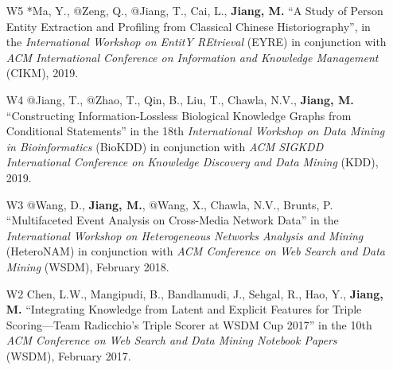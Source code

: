 \documentclass[10pt]{article}
\newenvironment{myindentpar}[1]%
{\begin{list}{}%
         {\setlength{\leftmargin}{#1}}%
         \item[]%
}
{\end{list}}
\newcounter{list}
\newcommand{\hide}[1]{}
\begin{document}
\begin{myindentpar}{0.00cm}
\begin{enumerate}[leftmargin=.5cm]
	\hide{\vspace{-0.1cm}\hspace{0.5cm}{\small \emph{I conceived the idea and wrote the paper. Mr. Zeng designed the study, and completed the experiments.}}}
	
\item[W5] *Ma, Y., @Zeng, Q., @Jiang, T., Cai, L., \textbf{Jiang, M.} ``A Study of Person Entity Extraction and Profiling from Classical Chinese Historiography'', in the \textit{International Workshop on EntitY REtrieval} (EYRE) in conjunction with \textit{ACM International Conference on Information and Knowledge Management} (CIKM), 2019.

	\hide{\vspace{-0.1cm}\hspace{0.5cm}{\small \emph{I conceived the idea. Mr. Ma designed the study, completed the experiments, and wrote the paper. I edited the paper.}}}

\item[W4] @Jiang, T., @Zhao, T., Qin, B., Liu, T., Chawla, N.V., \textbf{Jiang, M.} ``Constructing Information-Lossless Biological Knowledge Graphs from Conditional Statements'' in the 18th \textit{International Workshop on Data Mining in Bioinformatics} (BioKDD) in conjunction with \textit{ACM SIGKDD International Conference on Knowledge Discovery and Data Mining} (KDD), 2019.

	\hide{\vspace{-0.1cm}\hspace{0.5cm}{\small \emph{Mr. Jiang conceived the idea and wrote the paper. I edited the paper.}}}
	
\item[W3] @Wang, D., \textbf{Jiang, M.}, @Wang, X., Chawla, N.V., Brunts, P. ``Multifaceted Event Analysis on Cross-Media Network Data'' in the \textit{International Workshop on Heterogeneous Networks Analysis and Mining} (HeteroNAM) in conjunction with \textit{ACM Conference on Web Search and Data Mining} (WSDM), February 2018.

	\hide{\vspace{-0.1cm}\hspace{0.5cm}{\small \emph{I conceived the idea in consultation with Mr. Wang. Mr. Wang designed the study, completed the experiments, and wrote the paper. I edited the paper.}}}

\item[W2] Chen, L.W., Mangipudi, B., Bandlamudi, J., Sehgal, R., Hao, Y., \textbf{Jiang, M.} ``Integrating Knowledge from Latent and Explicit Features for Triple Scoring—Team Radicchio's Triple Scorer at WSDM Cup 2017'' in the 10th \textit{ACM Conference on Web Search and Data Mining Notebook Papers} (WSDM), February 2017.


\end{enumerate}
\end{myindentpar}
\end{document}
